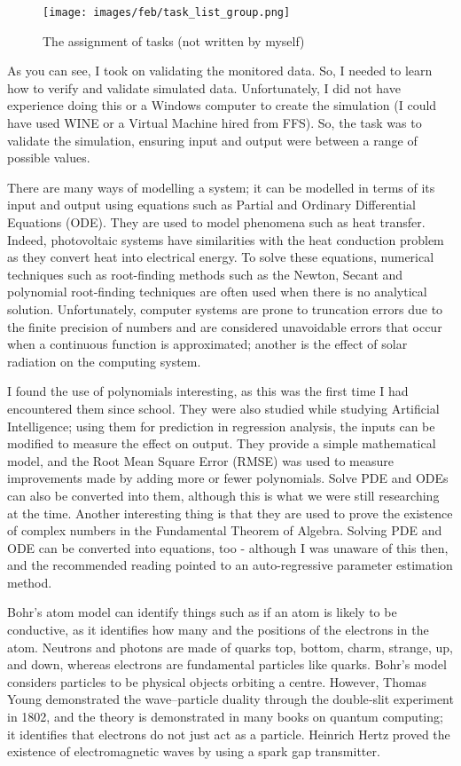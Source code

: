 \documentclass{article}
\begin{document}
\begin{figure}
\caption{The assignment of tasks (not written by myself)}
\centering
\texttt{[image: images/feb/task\_list\_group.png]}
\end{figure}

As you can see, I took on validating the monitored data. So, I needed to learn how to verify and validate simulated data. Unfortunately, I did not have experience doing this or a Windows computer to create the simulation (I could have used WINE or a Virtual Machine hired from FFS). So, the task was to validate the simulation, ensuring input and output were between a range of possible values. 

There are many ways of modelling a system; it can be modelled in terms of its input and output using equations such as Partial and Ordinary Differential Equations (ODE). They are used to model phenomena such as heat transfer. Indeed, photovoltaic systems have similarities with the heat conduction problem as they convert heat into electrical energy. To solve these equations, numerical techniques such as root-finding methods such as the Newton, Secant and polynomial root-finding techniques are often used when there is no analytical solution. Unfortunately, computer systems are prone to truncation errors due to the finite precision of numbers and are considered unavoidable errors that occur when a continuous function is approximated; another is the effect of solar radiation on the computing system. 

I found the use of polynomials interesting, as this was the first time I had encountered them since school. They were also studied while studying Artificial Intelligence; using them for prediction in regression analysis, the inputs can be modified to measure the effect on output. They provide a simple mathematical model, and the Root Mean Square Error (RMSE) was used to measure improvements made by adding more or fewer polynomials. Solve PDE and ODEs can also be converted into them, although this is what we were still researching at the time. Another interesting thing is that they are used to prove the existence of complex numbers in the Fundamental Theorem of Algebra. Solving PDE and ODE can be converted into equations, too - although I was unaware of this then, and the recommended reading pointed to an auto-regressive parameter estimation method.

Bohr's atom model can identify things such as if an atom is likely to be conductive, as it identifies how many and the positions of the electrons in the atom. Neutrons and photons are made of quarks top, bottom, charm, strange, up, and down, whereas electrons are fundamental particles like quarks. Bohr's model considers particles to be physical objects orbiting a centre. However, Thomas Young demonstrated the wave–particle duality through the double‐slit experiment in 1802, and the theory is demonstrated in many books on quantum computing; it identifies that electrons do not just act as a particle. Heinrich Hertz proved the existence of electromagnetic waves by using a spark gap transmitter. 
\end{document}
